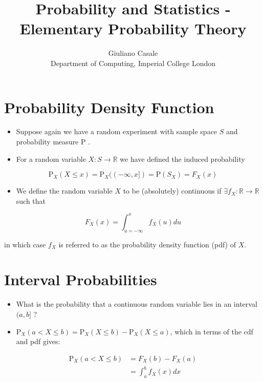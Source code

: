 \documentclass[10pt]{article}
\title{Probability and Statistics - Elementary Probability Theory }
\author{Giuliano Casale\\
Department of Computing, Imperial College London}
\date{}
\begin{document}
\maketitle


\section*{Probability Density Function}
\begin{itemize}
  \item Suppose again we have a random experiment with sample space $S$ and probability measure P .
  \item For a random variable $X: S \rightarrow \mathbb{R}$ we have defined the induced probability
\end{itemize}

$$
\mathrm{P}_{X}(X \leq x)=\mathrm{P}_{X}((-\infty, x])=\mathrm{P}\left(S_{X}\right)=F_{X}(x)
$$

\begin{itemize}
  \item We define the random variable $X$ to be (absolutely) continuous if $\exists f_{X}: \mathbb{R} \rightarrow \mathbb{R}$ such that
\end{itemize}


\begin{equation*}
F_{X}(x)=\int_{u=-\infty}^{x} f_{X}(u) d u \tag{1}
\end{equation*}


in which case $f_{X}$ is referred to as the probability density function (pdf) of $X$.

\section*{Interval Probabilities}
\begin{itemize}
  \item What is the probability that a continuous random variable lies in an interval $(a, b]$ ?
  \item $\mathrm{P}_{X}(a<X \leq b)=\mathrm{P}_{X}(X \leq b)-\mathrm{P}_{X}(X \leq a)$, which in terms of the cdf and pdf gives:
\end{itemize}

$$
\begin{aligned}
\mathrm{P}_{X}(a<X \leq b) & =F_{X}(b)-F_{X}(a) \\
& =\int_{a}^{b} f_{X}(x) d x
\end{aligned}
$$
\end{document}

